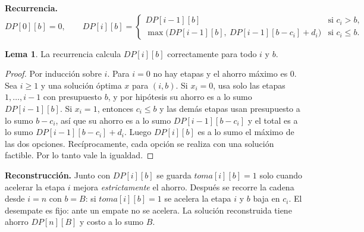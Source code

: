 \documentclass[11pt,a4paper]{article}
\theoremstyle{definition}
\newtheorem{lema}[definicion]{Lema}
\begin{document}
\textbf{Recurrencia.}
\[
DP[0][b]=0,\qquad
DP[i][b]=\begin{cases}
DP[i-1][b] & \text{si } c_i>b,\\[2pt]
\max\bigl(DP[i-1][b],\ DP[i-1][b-c_i]+d_i\bigr) & \text{si } c_i\le b.
\end{cases}
\]

\begin{lema}\label{lema:dp}
La recurrencia calcula $DP[i][b]$ correctamente para todo $i$ y $b$.
\end{lema}
\begin{proof}
Por inducción sobre $i$. Para $i=0$ no hay etapas y el ahorro máximo es $0$. Sea $i\ge 1$ y una solución óptima $x$ para $(i,b)$. Si $x_i=0$, usa solo las etapas $1,\dots,i-1$ con presupuesto $b$, y por hipótesis su ahorro es a lo sumo $DP[i-1][b]$. Si $x_i=1$, entonces $c_i\le b$ y las demás etapas usan presupuesto a lo sumo $b-c_i$, así que su ahorro es a lo sumo $DP[i-1][b-c_i]$ y el total es a lo sumo $DP[i-1][b-c_i]+d_i$. Luego $DP[i][b]$ es a lo sumo el máximo de las dos opciones. Recíprocamente, cada opción se realiza con una solución factible. Por lo tanto vale la igualdad.
\end{proof}

\textbf{Reconstrucción.} Junto con $DP[i][b]$ se guarda $toma[i][b]=1$ solo cuando acelerar la etapa $i$ mejora \emph{estrictamente} el ahorro. Después se recorre la cadena desde $i=n$ con $b=B$: si $toma[i][b]=1$ se acelera la etapa $i$ y $b$ baja en $c_i$. El desempate es fijo: ante un empate no se acelera. La solución reconstruida tiene ahorro $DP[n][B]$ y costo a lo sumo $B$.
\end{document}
